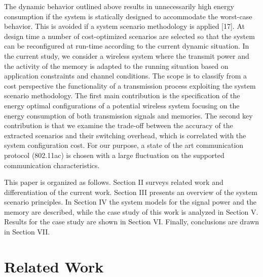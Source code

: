 	The dynamic behavior outlined above results in unnecessarily high energy consumption if the system is statically designed to accommodate the worst-case behavior. This is avoided if a system scenario methodology is applied [17]. At design time a number of cost-optimized scenarios are selected so that the system can be reconfigured at run-time according to the current dynamic situation. In the current study, we consider a wireless system where the transmit power and the activity of the memory is adapted to the running situation based on application constraints and channel conditions. The scope is to classify from a cost perspective the functionality of a transmission process exploiting the system scenario methodology. The first main contribution is the specification of the energy optimal configurations of a potential wireless system focusing on the energy consumption of both transmission signals and memories. The second key contribution is that we examine the trade-off between the accuracy of the extracted scenarios and their switching overhead, which is correlated with the system configuration cost. For our purpose, a state of the art communication protocol (802.11ac) is chosen with a large fluctuation on the supported communication characteristics.

This paper is organized as follows. Section II surveys related work and differentiation of the current work. Section III presents an overview of the system scenario principles. In Section IV the system models for the signal power and the memory are described, while the case study of this work is analyzed in Section V. Results for the case study are shown in Section VI. Finally, conclusions are drawn in Section VII.

\section{Related Work}

